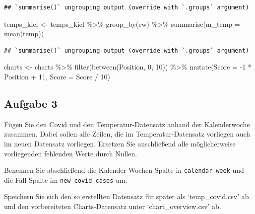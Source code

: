 \documentclass[
]{book}
\newenvironment{Shaded}{\begin{snugshade}}{\end{snugshade}}
\newcommand{\AttributeTok}[1]{\textcolor[rgb]{0.77,0.63,0.00}{#1}}
\newcommand{\DecValTok}[1]{\textcolor[rgb]{0.00,0.00,0.81}{#1}}
\newcommand{\FunctionTok}[1]{\textcolor[rgb]{0.00,0.00,0.00}{#1}}
\newcommand{\NormalTok}[1]{#1}
\newcommand{\OtherTok}[1]{\textcolor[rgb]{0.56,0.35,0.01}{#1}}
\newcommand{\SpecialCharTok}[1]{\textcolor[rgb]{0.00,0.00,0.00}{#1}}
\begin{document}
\begin{verbatim}
## `summarise()` ungrouping output (override with `.groups` argument)
\end{verbatim}

\begin{Shaded}
\begin{Highlighting}[]
\NormalTok{temps\_kiel }\OtherTok{\textless{}{-}}\NormalTok{ temps\_kiel }\SpecialCharTok{\%\textgreater{}\%} 
  \FunctionTok{group\_by}\NormalTok{(cw) }\SpecialCharTok{\%\textgreater{}\%} 
  \FunctionTok{summarise}\NormalTok{(}\AttributeTok{m\_temp =} \FunctionTok{mean}\NormalTok{(temp))}
\end{Highlighting}
\end{Shaded}

\begin{verbatim}
## `summarise()` ungrouping output (override with `.groups` argument)
\end{verbatim}

\begin{Shaded}
\begin{Highlighting}[]
\NormalTok{charts }\OtherTok{\textless{}{-}}\NormalTok{ charts }\SpecialCharTok{\%\textgreater{}\%} 
  \FunctionTok{filter}\NormalTok{(}\FunctionTok{between}\NormalTok{(Position, }\DecValTok{0}\NormalTok{, }\DecValTok{10}\NormalTok{)) }\SpecialCharTok{\%\textgreater{}\%} 
  \FunctionTok{mutate}\NormalTok{(}\AttributeTok{Score =} \SpecialCharTok{{-}}\DecValTok{1} \SpecialCharTok{*}\NormalTok{ Position }\SpecialCharTok{+} \DecValTok{11}\NormalTok{,}
         \AttributeTok{Score =}\NormalTok{ Score }\SpecialCharTok{/} \DecValTok{10}\NormalTok{)}
\end{Highlighting}
\end{Shaded}

\hypertarget{aufgabe-3-1}{%
\subsection{Aufgabe 3}\label{aufgabe-3-1}}

Fügen Sie den Covid und den Temperatur-Datensatz anhand der Kalenderwoche zusammen. Dabei sollen alle Zeilen, die im Temperatur-Datensatz vorliegen auch im neuen Datensatz vorliegen.
Ersetzen Sie anschließend alle möglicherweise vorliegenden fehlenden Werte durch Nullen.

Benennen Sie abschließend die Kalender-Wochen-Spalte in \texttt{calendar\_week} und die Fall-Spalte im \texttt{new\_covid\_cases} um.

Speichern Sie sich den so erstellten Datensatz für später als `temp\_covid.csv' ab und den vorbereiteten Charts-Datensatz unter `chart\_overview.csv' ab.
\end{document}
